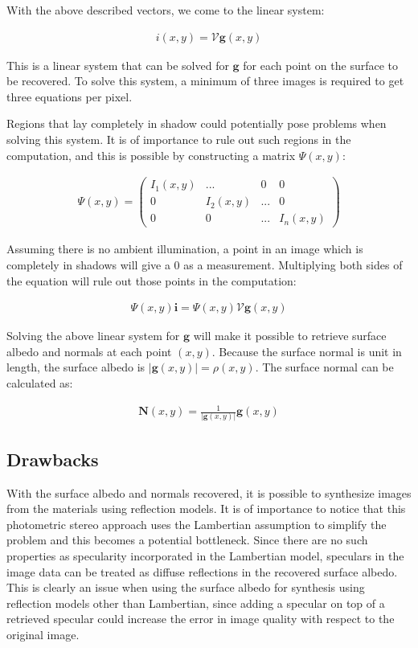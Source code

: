 \noindent With the above described vectors, we come to the linear system:

	\begin{eqnarray*}
		i(x,y) = \mathcal{V}\textbf{g}(x,y)
	\end{eqnarray*}

\noindent This is a linear system that can be solved for $\textbf{g}$ for each point on the surface to be recovered. To solve this system, a minimum of three images is required to get three equations per pixel.

Regions that lay completely in shadow could potentially pose problems when solving this system. It is of importance to rule out such regions in the computation, and this is possible by constructing a matrix $\Psi(x,y)$:

	\begin{eqnarray*}
		\Psi(x,y) = \begin{pmatrix} I_1(x,y) & ... & 0 & 0\\ 
									0 & I_2(x,y) & ... & 0\\ 
									0 & 0 & ... & I_n(x,y) \end{pmatrix}
	\end{eqnarray*}

\noindent Assuming there is no ambient illumination, a point in an image which is completely in shadows will give a 0 as a measurement. Multiplying both sides of the equation will rule out those points in the computation:

	\begin{eqnarray*}
		\Psi(x,y)\textbf{i} = \Psi(x,y)\mathcal{V}\textbf{g}(x,y)
	\end{eqnarray*}

\noindent Solving the above linear system for $\textbf{g}$ will make it possible to retrieve surface albedo and normals at each point $(x,y)$. Because the surface normal is unit in length, the surface albedo is $|\textbf{g}(x,y)| = \rho(x,y)$. The surface normal can be calculated as:

	\begin{eqnarray*}
		\textbf{N}(x,y) = \frac{1}{|\textbf{g}(x,y)|}\textbf{g}(x,y)
	\end{eqnarray*}


\subsection{Drawbacks}\label{drawbacks}
With the surface albedo and normals recovered, it is possible to synthesize images from the materials using reflection models. It is of importance to notice that this photometric stereo approach uses the Lambertian assumption to simplify the problem and this becomes a potential bottleneck. Since there are no such properties as specularity incorporated in the Lambertian model, speculars in the image data can be treated as diffuse reflections in the recovered surface albedo. This is clearly an issue when using the surface albedo for synthesis using reflection models other than Lambertian, since adding a specular on top of a retrieved specular could increase the error in image quality with respect to the original image.

